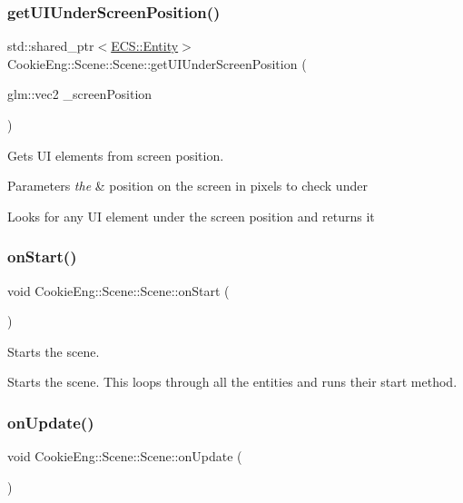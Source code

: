 \subsubsection{\texorpdfstring{get\+U\+I\+Under\+Screen\+Position()}{getUIUnderScreenPosition()}}
{\footnotesize\ttfamily std\+::shared\+\_\+ptr$<$\hyperlink{class_cookie_eng_1_1_e_c_s_1_1_entity}{E\+C\+S\+::\+Entity}$>$ Cookie\+Eng\+::\+Scene\+::\+Scene\+::get\+U\+I\+Under\+Screen\+Position (\begin{DoxyParamCaption}\item[{glm\+::vec2}]{\+\_\+screen\+Position }\end{DoxyParamCaption})}



Gets UI elements from screen position. 


\begin{DoxyParams}{Parameters}
{\em the} & position on the screen in pixels to check under\\
\hline
\end{DoxyParams}
Looks for any UI element under the screen position and returns it \mbox{\label{class_cookie_eng_1_1_scene_1_1_scene_ab66ffdb5475b0045d0ce5a846488590c}} 
\subsubsection{\texorpdfstring{on\+Start()}{onStart()}}
{\footnotesize\ttfamily void Cookie\+Eng\+::\+Scene\+::\+Scene\+::on\+Start (\begin{DoxyParamCaption}{ }\end{DoxyParamCaption})}



Starts the scene. 

Starts the scene. This loops through all the entities and runs their start method. \mbox{\label{class_cookie_eng_1_1_scene_1_1_scene_a10fa9798a2d0cff5527a4ca160a5202f}} 
\subsubsection{\texorpdfstring{on\+Update()}{onUpdate()}}
{\footnotesize\ttfamily void Cookie\+Eng\+::\+Scene\+::\+Scene\+::on\+Update (\begin{DoxyParamCaption}{ }\end{DoxyParamCaption})}




